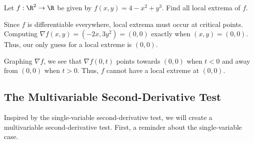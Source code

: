 \begin{example}
	Let $f:\R^2\to\R$ be given by $f(x,y)=4-x^2+y^3$.  Find all local extrema of
	$f$.

	Since $f$ is differentiable everywhere, local extrema must occur at critical
	points.  Computing $\nabla f(x,y)=(-2x,3y^2)=(0,0)$ exactly when $(x,y)=(0,0)$.
	Thus, our only guess for a local extreme is $(0,0)$.

	\begin{center}

	\end{center}

	Graphing $\nabla f$, we see that $\nabla f(0,t)$ points towards $(0,0)$
	when $t<0$ and away from $(0,0)$ when $t>0$.  Thus, $f$ cannot have a local
	extreme at $(0,0)$.
\end{example}


\subsection{The Multivariable Second-Derivative Test}

Inspired by the single-variable second-derivative test, we will
create a multivariable second-derivative test.  First, a reminder about
the single-variable case.

